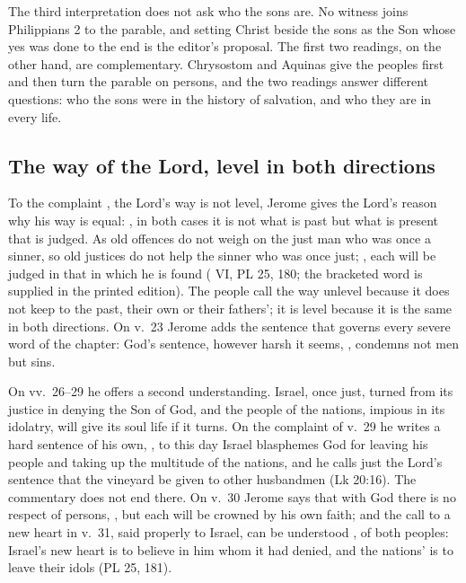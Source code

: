 The third interpretation does not ask who the sons are. No witness joins
Philippians 2 to the parable, and setting Christ beside the sons as the Son
whose yes was done to the end is the editor's proposal. The first two
readings, on the other hand, are complementary. Chrysostom and Aquinas give the
peoples first and then turn the parable on persons, and the two readings answer
different questions: who the sons were in the history of salvation, and who
they are in every life.

\subsection{The way of the Lord, level in both directions}

To the complaint , the Lord's way is not
level, Jerome gives the Lord's
reason why his way is equal: , in both cases it is not what is past but what is present that is
judged. As old offences do not weigh on the just man who was once a sinner, so
old justices do not help the sinner who was once just; , each will be judged in that in which he
is found ( VI, PL 25, 180; the bracketed word is
supplied in the printed edition). The people call the way unlevel because it does not keep
to the past, their own or their fathers'; it is level because it is the same in
both directions. On v.~23 Jerome adds the sentence that governs every severe
word of the chapter: God's sentence, however harsh it seems, , condemns not men but sins.

On vv.~26--29 he offers a second understanding. Israel, once just, turned from
its justice in denying the Son of God, and the people of the nations, impious
in its idolatry, will give its soul life if it turns. On the complaint of v.~29
he writes a hard sentence of his own, , to
this day Israel blasphemes God for leaving his people and taking up the
multitude of the nations, and
he calls just the Lord's sentence that the vineyard be given to other
husbandmen (Lk 20:16). The commentary does not end there. On v.~30 Jerome says
that with God there is no respect of persons, , but each will be crowned by his own faith; and the call to a
new heart in v.~31, said properly to Israel, can be understood , of both peoples: Israel's new heart is to believe in him
whom it had denied, and the nations' is to leave their idols (PL 25, 181).

